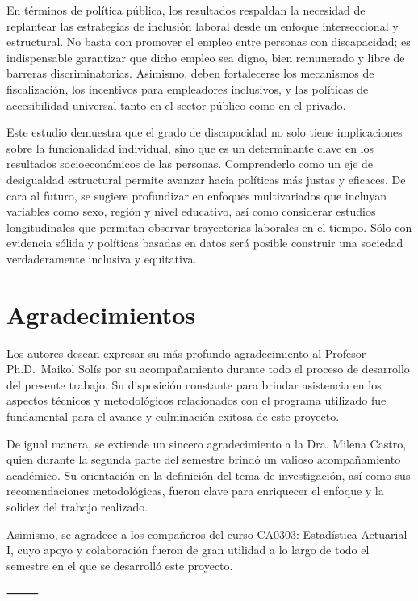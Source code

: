 \documentclass[
  11pt,
  oneside]{article}
\begin{document}
En términos de política pública, los resultados respaldan la necesidad
de replantear las estrategias de inclusión laboral desde un enfoque
interseccional y estructural. No basta con promover el empleo entre
personas con discapacidad; es indispensable garantizar que dicho empleo
sea digno, bien remunerado y libre de barreras discriminatorias.
Asimismo, deben fortalecerse los mecanismos de fiscalización, los
incentivos para empleadores inclusivos, y las políticas de accesibilidad
universal tanto en el sector público como en el privado.

Este estudio demuestra que el grado de discapacidad no solo tiene
implicaciones sobre la funcionalidad individual, sino que es un
determinante clave en los resultados socioeconómicos de las personas.
Comprenderlo como un eje de desigualdad estructural permite avanzar
hacia políticas más justas y eficaces. De cara al futuro, se sugiere
profundizar en enfoques multivariados que incluyan variables como sexo,
región y nivel educativo, así como considerar estudios longitudinales
que permitan observar trayectorias laborales en el tiempo. Sólo con
evidencia sólida y políticas basadas en datos será posible construir una
sociedad verdaderamente inclusiva y equitativa.

\section{Agradecimientos}\label{agradecimientos}

Los autores desean expresar su más profundo agradecimiento al Profesor
Ph.D.~Maikol Solís por su acompañamiento durante todo el proceso de
desarrollo del presente trabajo. Su disposición constante para brindar
asistencia en los aspectos técnicos y metodológicos relacionados con el
programa utilizado fue fundamental para el avance y culminación exitosa
de este proyecto.

De igual manera, se extiende un sincero agradecimiento a la Dra. Milena
Castro, quien durante la segunda parte del semestre brindó un valioso
acompañamiento académico. Su orientación en la definición del tema de
investigación, así como sus recomendaciones metodológicas, fueron clave
para enriquecer el enfoque y la solidez del trabajo realizado.

Asimismo, se agradece a los compañeros del curso CA0303: Estadística
Actuarial I, cuyo apoyo y colaboración fueron de gran utilidad a lo
largo de todo el semestre en el que se desarrolló este proyecto.

⸻
\end{document}
